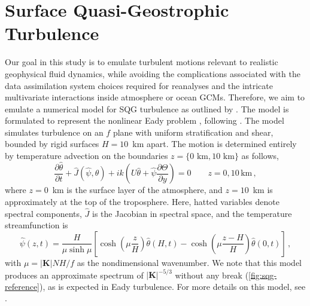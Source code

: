 \section{Surface Quasi-Geostrophic Turbulence}
\label{sec:sqg}

Our goal in this study is to emulate turbulent motions relevant to realistic
geophysical fluid dynamics, while avoiding the complications
associated with the data assimilation system choices required for reanalyses
and the intricate multivariate interactions inside atmosphere or ocean GCMs.
Therefore, we aim to emulate a numerical model for
SQG turbulence as outlined by \citet{tulloch_note_2009}.
The model is formulated to represent the nonlinear Eady problem
\citep{eady_long_1949}, following \citet{blumen_uniform_1978-1}.
The model simulates turbulence
on an $f$ plane with uniform stratification and shear, bounded by rigid
surfaces $H=10$~km apart.
The motion is determined entirely by temperature advection on the boundaries
$z=\{0\text{~km},10\text{~km}\}$ as follows,
\begin{equation*}
    \dfrac{\partial \hat{\theta}}{\partial t} +
    \hat{J}(\hat{\psi}, \hat{\theta}) + ik\left(U \hat{\theta} +
        \hat{\psi}\dfrac{\partial \Theta}{\partial y}\right)
    = 0 \qquad z = 0, 10\,\text{km} \, ,
\end{equation*}
where $z=0$~km is the surface layer of the atmosphere, and $z=10$~km is
approximately at the top of the troposphere.
Here, hatted variables denote spectral components, $\hat{J}$ is the Jacobian in
spectral space, and the temperature streamfunction is
\begin{equation*}
    \hat{\psi}(z,t) = \dfrac{H}{\mu\sinh\mu}
    \left[ \cosh\left(\mu\dfrac{z}{H}\right) \hat{\theta}(H,t)
        - \cosh\left(\mu\dfrac{z-H}{H}\right) \hat{\theta}(0,t)
    \right]\, ,
\end{equation*}
with $\mu = |\mathbf{K}| NH/f$ as the nondimensional wavenumber.
We note that this model produces an approximate spectrum of
$|\mathbf{K}|^{-5/3}$ without any break (\cref{fig:sqg-reference}),
as is expected in Eady turbulence.
For more details on this model, see \citep{tulloch_note_2009}.


